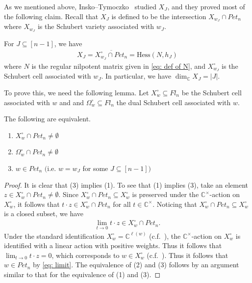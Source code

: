 As we mentioned above, Insko--Tymoczko~\cite{Insko-Tymoczko} studied $X_J$, and they proved most of the following claim. Recall that $X_J$ is defined to be the intersection $X_{w_J}\cap Pet_{n}$ where $X_{w_J}$ is the Schubert variety associated with $w_J$. 

\begin{prop}\label{prop: XJ and Hess}
For $J\subseteq [n-1]$, we have
\begin{align}\label{eq: two equalities}
 X_J = \overline{X^{\circ}_{w_J}\cap Pet_{n}} = \text{Hess}(N,h_J)
\end{align}
where $N$ is the regular nilpotent matrix given in \eqref{eq: def of N}, and $X^{\circ}_{w_J}$ is the Schubert cell associated with $w_J$. In particular, we have $\dim_{{\mathbb C}} X_J = |J|$.
\end{prop}

To prove this, we need the following lemma. Let $X^{\circ}_{w}\subseteq Fl_n$ be the Schubert cell associated with $w$ and and $\Omega^{\circ}_w\subseteq Fl_n$ the dual Schubert cell associated with $w$.

\begin{lemma}\label{lem: intersection with dual cell}
The following are equivalent.
\begin{enumerate}
 \item $X^{\circ}_w\cap Pet_{n}\ne\emptyset$
 \item $\Omega^{\circ}_w\cap Pet_{n}\ne\emptyset$
 \item $w\in Pet_{n}$ $($i.e. $w=w_J$ for some $J\subseteq[n-1])$
\end{enumerate}
\end{lemma}

\begin{proof}
It is clear that (3) implies (1). To see that (1) implies (3), take an  element $z\in X^{\circ}_w\cap Pet_{n}\ne\emptyset$. Since $X^{\circ}_w\cap Pet_{n}\subseteq X^{\circ}_w$ is preserved under the ${\mathbb C}^{\times}$-action on $X^{\circ}_w$, it follows that $t\cdot z\in X^{\circ}_w\cap Pet_{n}$ for all $t\in {\mathbb C}^{\times}$. Noticing that $X^{\circ}_w\cap Pet_{n}\subseteq X^{\circ}_w$ is a closed subset, we have 
\begin{align}\label{eq: limit}
\lim_{t\rightarrow0}t\cdot z\in X^{\circ}_w\cap Pet_{n}.
\end{align}
Under the standard identification $X^{\circ}_w = {\mathbb C}^{\ell(w)}$ (c.f.~\cite[Sect.\ 10.2]{fult97}), the ${\mathbb C}^{\times}$-action on $X^{\circ}_w$ is identified with a linear action with positive weights. Thus it follows that $\lim_{t\rightarrow0}t\cdot z=0$, which corresponds to $w\in X^{\circ}_w$ (c.f.~\cite[proof of Lemma~5]{Insko-Tymoczko}). Thus it follows that $w\in Pet_{n}$ by \eqref{eq: limit}. The equivalence of (2) and (3) follows by an argument similar to that for the equivalence of (1) and (3).
\end{proof}

